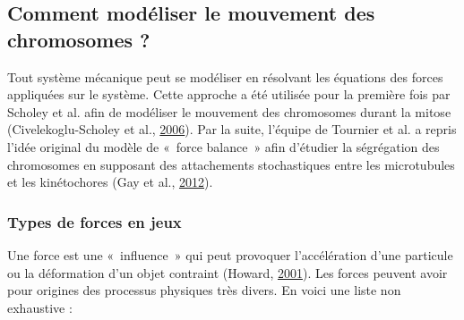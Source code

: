 \documentclass[12pt,a4paper,twoside,openright]{book}
\begin{document}
\subsection{Comment modéliser le mouvement des chromosomes
?}\label{comment-moduxe9liser-le-mouvement-des-chromosomes}

Tout système mécanique peut se modéliser en résolvant les équations des
forces appliquées sur le système. Cette approche a été utilisée pour la
première fois par Scholey et al. afin de modéliser le mouvement des
chromosomes durant la mitose (Civelekoglu-Scholey et al.,
\protect\hyperlink{ref-Civelekoglu-Scholey2006}{2006}). Par la suite,
l'équipe de Tournier et al. a repris l'idée original du modèle de
«~force balance~» afin d'étudier la ségrégation des chromosomes en
supposant des attachements stochastiques entre les microtubules et les
kinétochores (Gay et al., \protect\hyperlink{ref-Gay2012a}{2012}).

\subsubsection{Types de forces en jeux}\label{types-de-forces-en-jeux}

Une force est une «~influence~» qui peut provoquer l'accélération d'une
particule ou la déformation d'un objet contraint (Howard,
\protect\hyperlink{ref-Howard2001}{2001}). Les forces peuvent avoir pour
origines des processus physiques très divers. En voici une liste non
exhaustive :
\end{document}

